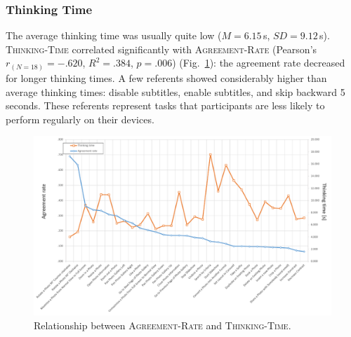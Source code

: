 \subsubsection{Thinking Time}
The average thinking time was usually quite low ($M{=}6.15$\,s, $SD{=}9.12$\,s). 
\textsc{Thinking-Time} correlated significantly with \textsc{Agreement-Rate} (Pearson's $r_{(N=18)}{=}-.620$, $R^2{=}.384$, $p{=}.006$) (Fig.~\ref{fig:thinking-time}): the agreement rate decreased for longer thinking times. A few referents showed considerably higher than average thinking times: disable subtitles, enable subtitles, and skip backward 5 seconds. These referents represent tasks that participants are less likely to perform regularly on their devices.

\begin{figure}
    \centering
    \captionsetup{justification=centering}
    \includegraphics[width=\linewidth]{Figures/App-LUIGES/thinking-time.pdf}
    \caption{Relationship between \textsc{Agreement-Rate} and \textsc{Thinking-Time}.}
    \label{fig:thinking-time}
\end{figure}




